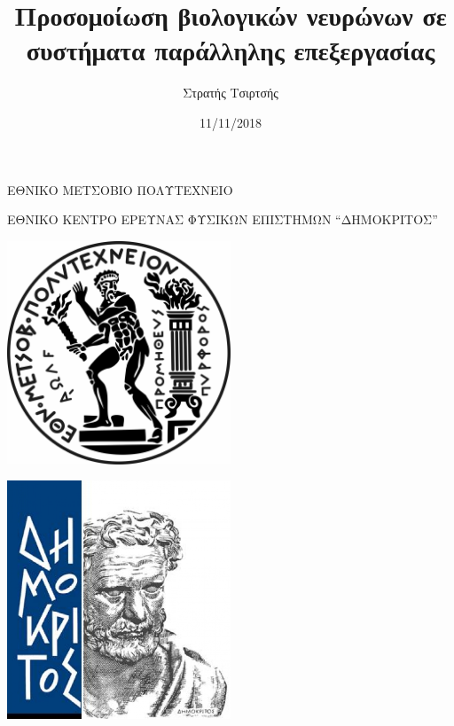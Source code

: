\documentclass[12pt,a4paper]{article}
\title{Προσομοίωση βιολογικών νευρώνων σε συστήματα παράλληλης επεξεργασίας}
\author{Στρατής Τσιρτσής}
\date{11/11/2018}
\begin{document}
\begin{titlepage}

\newcommand{\HRule}{\rule{\linewidth}{0.5mm}} %

\center %
 

\begin{minipage}[t]{0.45\textwidth}
\centering
ΕΘΝΙΚΟ ΜΕΤΣΟΒΙΟ ΠΟΛΥΤΕΧΝΕΙΟ
\end{minipage}\hfill
\begin{minipage}[t]{0.45\textwidth}
\centering
ΕΘΝΙΚΟ ΚΕΝΤΡΟ ΕΡΕΥΝΑΣ ΦΥΣΙΚΩΝ ΕΠΙΣΤΗΜΩΝ ``ΔΗΜΟΚΡΙΤΟΣ''
\vspace{\baselineskip}
\end{minipage}

\begin{minipage}[t]{0.45\textwidth}
\centering
\includegraphics[width=0.5\textwidth]{Figures/ntua.jpg}
\end{minipage}\hfill
\begin{minipage}[t]{0.45\textwidth}
\centering
	\includegraphics[width=0.5\textwidth]{Figures/dimokritos.jpg}
\end{minipage}


\end{titlepage}
\end{document}
